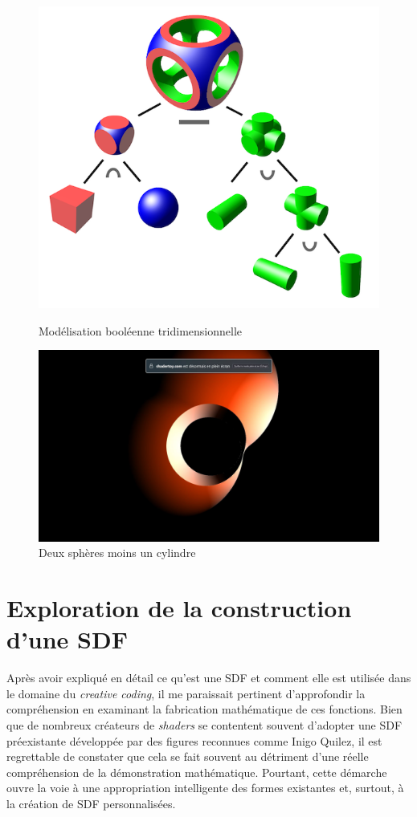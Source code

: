 \begin{figure}[h]
  \begin{minipage}[b]{0.45\linewidth}
    \centering
    \includegraphics[height=.5\linewidth]{images/sdf/sdf00.png}
    \caption{Modélisation booléenne tridimensionnelle}
    \label{sdf00}
  \end{minipage}
  \hspace{0.1\linewidth} %
  \begin{minipage}[b]{0.45\linewidth}
    \centering
    \includegraphics[width=\linewidth]{images/shaders/shaderatelier_01.jpg}
    \caption{Deux sphères moins un cylindre}
    \label{shaderat01}
  \end{minipage}
\end{figure}


\newpage
\section{Exploration de la construction d'une SDF}

Après avoir expliqué en détail ce qu'est une SDF et comment elle est utilisée dans le domaine du \textit{creative coding}, il me paraissait pertinent d'approfondir la compréhension en examinant la fabrication mathématique de ces fonctions. Bien que de nombreux créateurs de \textit{shaders} se contentent souvent d'adopter une SDF préexistante développée par des figures reconnues comme Inigo Quilez, il est regrettable de constater que cela se fait souvent au détriment d'une réelle compréhension de la démonstration mathématique. Pourtant, cette démarche ouvre la voie à une appropriation intelligente des formes existantes et, surtout, à la création de SDF personnalisées. 

